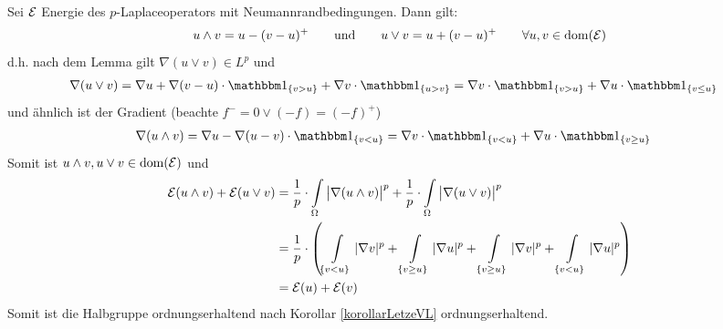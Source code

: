 \begin{beispiel}
	\begin{beispiel}
		Sei $\mathcal{E}$ Energie des $p$-Laplaceoperators mit Neumannrandbedingungen.
		Dann gilt:
		\begin{align*}
			u\wedge v=u-(v-u)^+
			\qquad\text{und}\qquad
			u\vee v=u+(v-u)^+
			\qquad\forall u,v\in\operatorname{dom}(\mathcal{E})
		\end{align*}
		d.h. nach dem Lemma gilt $\nabla(u\vee v)\in L^p$ und
		\begin{align*}
			\nabla(u\vee v)
			&=\nabla u+\nabla (v-u)\cdot\indi_{\lbrace v>u\rbrace}+\nabla v\cdot\indi_{\lbrace u>v\rbrace}
			=\nabla v\cdot\indi_{\lbrace v>u\rbrace}+\nabla u\cdot\indi_{\lbrace v\leq u\rbrace}
		\end{align*}
		und ähnlich ist der Gradient (beachte $f^-=0\vee(-f)=(-f)^+$)
		\begin{align*}
			\nabla(u\wedge v)
			&=\nabla u-\nabla (u-v)\cdot\indi_{\lbrace v<u\rbrace}
			=\nabla v\cdot\indi_{\lbrace v<u\rbrace}+\nabla u\cdot\indi_{\lbrace v\geq u\rbrace}
		\end{align*}
		Somit ist $u\wedge v,u\vee v\in\operatorname{dom}(\mathcal{E})$ und 
		\begin{align*}
			\mathcal{E}(u\wedge v)+\mathcal{E}(u\vee v)
			&=\frac{1}{p}\cdot\int\limits_\Omega\big|\nabla (u\wedge v)\big|^p+\frac{1}{p}\cdot\int\limits_\Omega\big|\nabla (u\vee v)\big|^p\\
			&=\frac{1}{p}\cdot\left(\int\limits_{\lbrace v<u\rbrace}|\nabla v|^p+\int\limits_{\lbrace v\geq u\rbrace}|\nabla u|^p
				+\int\limits_{\lbrace v\geq u\rbrace}|\nabla v|^p+\int\limits_{\lbrace v< u\rbrace}|\nabla u|^p\right)\\
				&=\mathcal{E}(u)+\mathcal{E}(v)
		\end{align*}
		Somit ist die Halbgruppe ordnungserhaltend nach Korollar \ref{korollarLetzeVL} ordnungserhaltend.
	\end{beispiel}
\end{beispiel}

